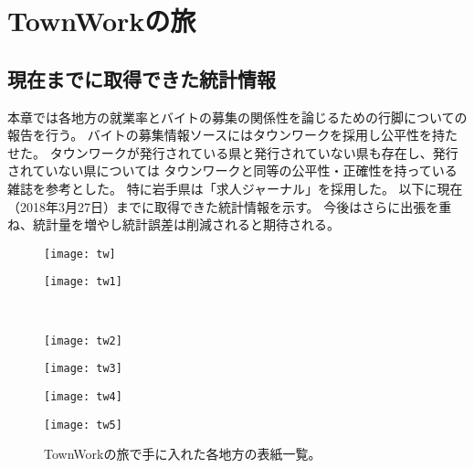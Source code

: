 \section{TownWorkの旅}
\subsection{現在までに取得できた統計情報}
本章では各地方の就業率とバイトの募集の関係性を論じるための行脚についての報告を行う。
バイトの募集情報ソースにはタウンワークを採用し公平性を持たせた。
タウンワークが発行されている県と発行されていない県も存在し、発行されていない県については
タウンワークと同等の公平性・正確性を持っている雑誌を参考とした。
特に岩手県は「求人ジャーナル」を採用した。
以下に現在（2018年3月27日）までに取得できた統計情報を示す。
今後はさらに出張を重ね、統計量を増やし統計誤差は削減されると期待される。

\begin{figure}[htbp]
\vspace{-10mm}
    \centering
  \begin{minipage}{0.4\linewidth}
    \centering
    \texttt{[image: tw]}
  \end{minipage}
  \begin{minipage}{0.4\linewidth}
    \centering
    \texttt{[image: tw1]}
  \end{minipage}\\
  \begin{minipage}{0.4\linewidth}
    \centering
    \texttt{[image: tw2]}
  \end{minipage}
  \begin{minipage}{0.4\linewidth}
    \centering
    \texttt{[image: tw3]}
  \end{minipage}
  \begin{minipage}{0.4\linewidth}
    \centering
    \texttt{[image: tw4]}
  \end{minipage}
  \begin{minipage}{0.4\linewidth}
    \centering
    \texttt{[image: tw5]}
  \end{minipage}
  \caption{TownWorkの旅で手に入れた各地方の表紙一覧。}
  \label{CscDetaDphi-CSide}
\end{figure}

